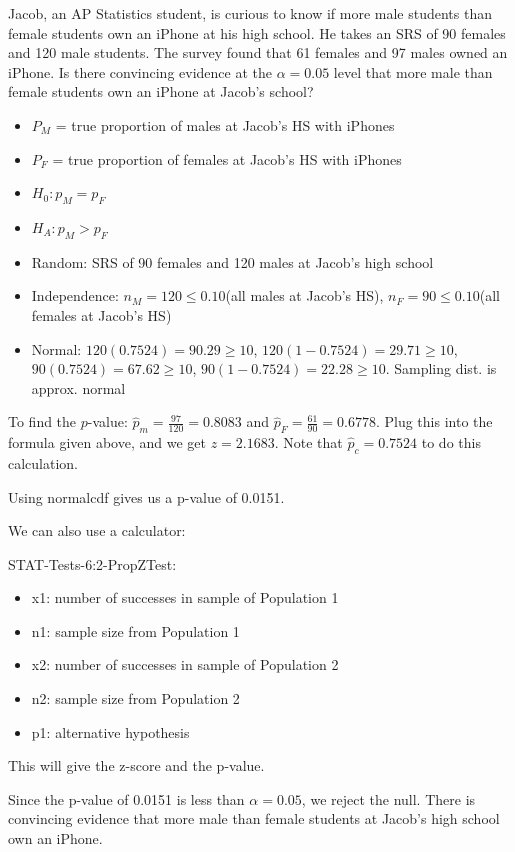 \documentclass[../stats.tex]{subfiles}
\begin{document}
\begin{example}
    Jacob, an AP Statistics student, is curious to know if more male students than female students own an iPhone at his high school. He takes an SRS of 90 females and 120 male students. The survey found 
    that 61 females and 97 males owned an iPhone. Is there convincing evidence at the $\alpha=0.05$ level that more male than female students own an iPhone at Jacob's school?

    \begin{itemize}
        \item $P_M$ = true proportion of males at Jacob's HS with iPhones 
        \item $P_F$ = true proportion of females at Jacob's HS with iPhones 
    \end{itemize}

    \begin{itemize}
        \item $H_0: p_M=p_F$
        \item $H_A: p_M>p_F$
    \end{itemize}

    \begin{itemize}
        \item Random: SRS of 90 females and 120 males at Jacob's high school 
        \item Independence: $n_M=120\leq 0.10$(all males at Jacob's HS), $n_F=90\leq 0.10$(all females at Jacob's HS)
        \item Normal: $120(0.7524)=90.29\geq 10$, $120(1-0.7524)=29.71\geq 10$, $90(0.7524)=67.62\geq 10$, $90(1-0.7524)=22.28\geq 10$. Sampling dist. is approx. normal 
    \end{itemize}

    To find the $p$-value: $\hat{p}_m=\frac{97}{120}=0.8083$ and $\hat{p}_F=\frac{61}{90}=0.6778$. Plug this into the formula given above, and we get $z=2.1683$. Note that $\hat{p}_c = 0.7524$ to do this calculation.

    Using normalcdf gives us a p-value of 0.0151.

    We can also use a calculator: 

    STAT-Tests-6:2-PropZTest:
    \begin{itemize}
        \item x1: number of successes in sample of Population 1
        \item n1: sample size from Population 1
        \item x2: number of successes in sample of Population 2
        \item n2: sample size from Population 2
        \item p1: alternative hypothesis 
    \end{itemize}

    This will give the z-score and the p-value.

    Since the p-value of 0.0151 is less than $\alpha=0.05$, we reject the null. There is convincing evidence that more male than female students at Jacob's high school own an iPhone.
\end{example}
\end{document}

